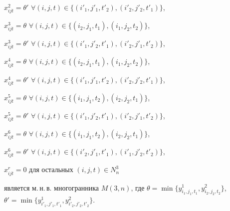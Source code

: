 \begin{lem}
$x_{ijt}^2=\theta'$ $\forall (i,j,t)\in


\{(i'_1,j'_1,t'_2),(i'_2,j'_2,t'_1)\}$,





$x_{ijt}^3=\theta$ $\forall (i,j,t)\in


\{(i_2,j_1,t_1),(i_1,j_2,t_2)\}$,





$x_{ijt}^3=\theta'$ $\forall (i,j,t)\in


\{(i'_1,j'_2,t'_1),(i'_2,j'_1,t'_2)\}$,





$x_{ijt}^4=\theta$ $\forall (i,j,t)\in


\{(i_2,j_1,t_1),(i_1,j_2,t_2)\}$,





$x_{ijt}^4=\theta'$ $\forall (i,j,t)\in


\{(i'_1,j'_1,t'_2),(i'_2,j'_2,t'_1)\}$,





$x_{ijt}^5=\theta$ $\forall (i,j,t)\in


\{(i_1,j_1,t_2),(i_2,j_2,t_1)\}$,





$x_{ijt}^5=\theta'$ $\forall (i,j,t)\in


\{(i'_1,j'_2,t'_1),(i'_2,j'_1,t'_2)\}$,





$x_{ijt}^6=\theta$ $\forall (i,j,t)\in


\{(i_1,j_1,t_2),(i_2,j_2,t_1)\}$,





$x_{ijt}^6=\theta'$ $\forall (i,j,t)\in


\{(i'_2,j'_1,t'_1),(i'_1,j'_2,t'_2)\}$,





$x_{ijt}^r=0$ для остальных $(i,j,t)\in N_n^3$





\noindent{}является м.\,н.\,в. многогранника $M(3,n)$, где $\theta=\min


\{y_{i_1,j_1,t_1}^1, y_{i_2,j_2,t_2}^2 \}$, $\theta'=\min


\{y_{i'_1,j'_1,t'_1}^1, y_{i'_2,j'_2,t'_2}^2 \}$.


\end{lem}





